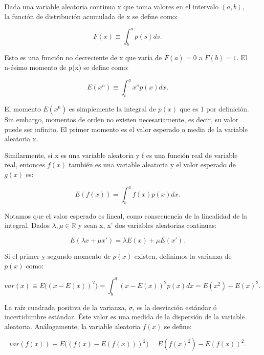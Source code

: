 \documentclass[../proyecto.tex]{memoir}
\begin{document}
Dada una variable aleatoria continua x que toma valores en el intervalo $(a,b)$, la función de distribución acumulada de x se define como:


\begin{equation*}
F(x) \equiv \int^{a}_{b}p(s)ds.
\end{equation*}

Esto es una función no decreciente de x que varía de $F(a)=0$ a $F(b)=1$. El n-ésimo momento de p(x) se define como:

\begin{equation*}
E(x^{n}) \equiv \int^{a}_{b}x^{n}p(x)dx.
\end{equation*}

El momento $E(x^{0})$ es simplemente la integral de $p(x)$ que es 1 por definición. Sin embargo, momentos de orden no existen necesariamente, es decir, su valor puede ser infinito. El primer momento es el valor esperado o media de la variable aleatoria x.

Similarmente, si x es una variable aleatoria y f es una función real de variable real, entonces $f(x)$ también es una variable aleatoria y el valor esperado de $g(x)$ es:

\begin{equation*}
E(f(x)) = \int^{a}_{b}f(x)p(x)dx.
\end{equation*}

Notamos que el valor esperado es lineal, como consecuencia de la linealidad de la integral. Dados $\lambda, \mu \in \mathds{R}$ y sean x, x' dos variables aleatorias continuas:

\begin{equation*}
E(\lambda x+\mu x') = \lambda E(x) + \mu E(x').
\end{equation*}

Si el primer y segundo momento de $p(x)$ existen, definimos la varianza de $p(x)$ como:

\begin{equation*}
var(x) \equiv E \big((x-E(x))^{2}\big) = \int^{a}_{b} (x-E(x))^{2} p(x) dx =  E(x^{2})-E(x)^{2}.
\end{equation*}

La raíz cuadrada positiva de la varianza, $\sigma$, es la desviación estándar ó incertidumbre estándar. Éste valor es una medida de la dispersión de la variable aleatoria. Análogamente, la variable aleatoria $f(x)$ se define:

\begin{equation*}
var(f(x)) \equiv E \big((f(x)-E(f(x)))^{2}\big) =  E(f(x)^{2})-E(f(x))^{2}.
\end{equation*}
\end{document}
